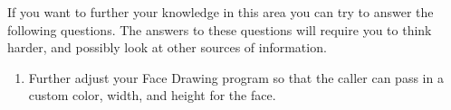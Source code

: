 \bigskip

If you want to further your knowledge in this area you can try to answer the following questions. The answers to these questions will require you to think harder, and possibly look at other sources of information.

\begin{enumerate}
  \item Further adjust your Face Drawing program so that the caller can pass in a custom color, width, and height for the face.
  
\end{enumerate}

